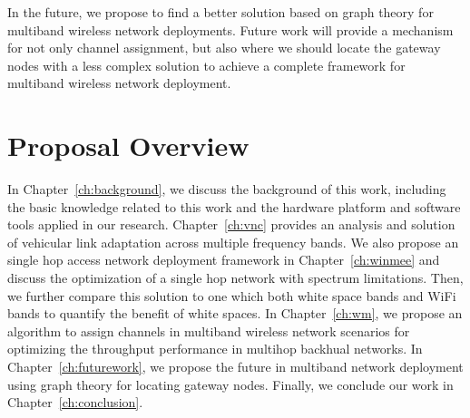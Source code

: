 In the future, we propose to find a better solution based on graph theory for multiband 
wireless network deployments. Future work will provide a mechanism for not only channel 
assignment, but also where we should locate the gateway nodes with a less complex solution 
to achieve a complete framework for multiband wireless network deployment. 
%


\section{Proposal Overview}

In Chapter~\ref{ch:background}, we discuss the background of this work, including the 
basic knowledge related to this work and the hardware platform and software tools applied 
in our research. 
Chapter~\ref{ch:vnc} provides an analysis and solution of vehicular 
link adaptation across multiple frequency bands. 
We also propose an single hop access network deployment 
framework in Chapter~\ref{ch:winmee} and discuss the optimization of a single hop network 
with spectrum limitations. Then, we further compare this solution to one which both white 
space bands and WiFi bands to quantify the benefit of white spaces. 
In Chapter~\ref{ch:wm}, we propose an algorithm to assign channels in multiband wireless 
network scenarios for optimizing the throughput performance in multihop backhual networks. 
In Chapter~\ref{ch:futurework}, we propose the future in multiband network deployment 
using graph theory for locating gateway nodes. 
Finally, we conclude our work in Chapter~\ref{ch:conclusion}.
